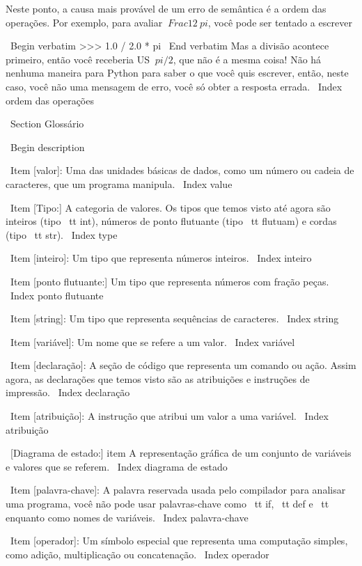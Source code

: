 \documentclass[10pt]{book}
\begin{document}
\begin {itemize}
{Neste ponto, a causa mais provável de um erro de semântica é
a ordem das operações. Por exemplo, para avaliar
 $ \ Frac {1} {2 \ pi} $,
você pode ser tentado a escrever

\ Begin {verbatim}
>>> 1.0 / 2.0 * pi
\ End {verbatim}
%
Mas a divisão acontece primeiro, então você receberia US $ \ pi / 2 $, que
não é a mesma coisa! Não há nenhuma maneira para Python
para saber o que você quis escrever, então, neste caso, você não
uma mensagem de erro, você só obter a resposta errada.
\ Index {ordem das operações}


\ Section {} Glossário

\ Begin {description}

\ Item [valor]: Uma das unidades básicas de dados, como um número ou cadeia de caracteres, 
que um programa manipula.
\ Index {value}

\ Item [Tipo:] A categoria de valores. Os tipos que temos visto até agora
são inteiros (tipo {\ tt int}), números de ponto flutuante (tipo {\ tt
flutuam}) e cordas (tipo {\ tt str}).
\ Index {type}

\ Item [inteiro]: Um tipo que representa números inteiros.
\ Index {inteiro}

\ Item [ponto flutuante:] Um tipo que representa números com fração
peças.
\ Index {ponto flutuante}

\ Item [string]: Um tipo que representa sequências de caracteres.
\ Index {string}

\ Item [variável]: Um nome que se refere a um valor.
\ Index {variável}

\ Item [declaração]: A seção de código que representa um comando ou ação. Assim
agora, as declarações que temos visto são as atribuições e instruções de impressão.
\ Index {declaração}

\ Item [atribuição]: A instrução que atribui um valor a uma variável.
\ Index {atribuição}

\ [Diagrama de estado:] item A representação gráfica de um conjunto de variáveis ​​e
valores que se referem.
\ Index {diagrama de estado}

\ Item [palavra-chave]: A palavra reservada usada pelo compilador para analisar uma
programa, você não pode usar palavras-chave como {\ tt if}, {\ tt def} e {\ tt enquanto} como
nomes de variáveis.
\ Index {palavra-chave}

\ Item [operador]: Um símbolo especial que representa uma computação simples, como
adição, multiplicação ou concatenação.
\ Index {operador}

}
\end{itemize}
\end{document}
